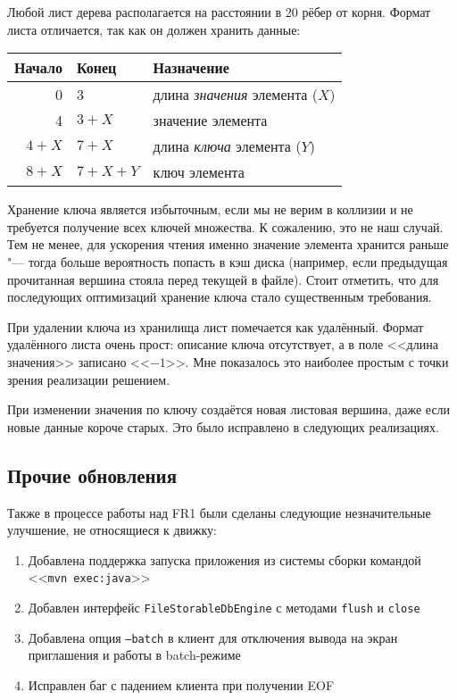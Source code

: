 \documentclass[a4paper]{article}
\renewcommand{\t}{\texttt}
\begin{document}
  Любой лист дерева располагается на расстоянии в 20 рёбер от корня. Формат листа отличается, так
  как он должен хранить данные:

  \begin{tabular}{|r|l|l|}
  \hline
  Начало & Конец & Назначение \\ \hline
  0 & 3 & длина \textit{значения} элемента ($X$) \\ \hline
  4 & $3 + X$ & значение элемента \\ \hline
  $4 + X$ & $7 + X$ & длина \textit{ключа} элемента ($Y$) \\ \hline
  $8 + X$ & $7 + X + Y$ & ключ элемента \\ \hline
  \end{tabular}

  Хранение ключа является избыточным, если мы не верим в коллизии и не требуется получение всех ключей
  множества. К сожалению, это не наш случай. Тем не менее, для ускорения чтения именно значение элемента
  хранится раньше "--- тогда больше вероятность попасть в кэш диска (например, если предыдущая прочитанная
  вершина стояла перед текущей в файле). Стоит отметить, что для последующих оптимизаций хранение ключа
  стало существенным требования.

  При удалении ключа из хранилища лист помечается как удалённый. Формат удалённого листа очень прост:
  описание ключа отсутствует, а в поле <<длина значения>> записано <<$-1$>>. Мне показалось это наиболее простым
  с точки зрения реализации решением.

  При изменении значения по ключу создаётся новая листовая вершина, даже если новые данные короче старых.
  Это было исправлено в следующих реализациях.

\subsection{Прочие обновления}
  Также в процессе работы над FR1 были сделаны следующие незначительные улучшение, не относящиеся к движку:

  \begin{enumerate}
  \item Добавлена поддержка запуска приложения из системы сборки командой <<\t{mvn exec:java}>>
  \item Добавлен интерфейс \t{FileStorableDbEngine} с методами \t{flush} и \t{close}
  \item Добавлена опция \t{--batch} в клиент для отключения вывода на экран приглашения и работы
        в batch-режиме
  \item Исправлен баг с падением клиента при получении EOF
  \end{enumerate}
\end{document}
